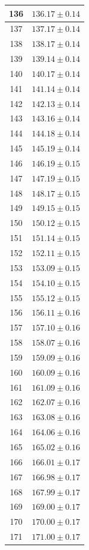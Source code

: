 \documentclass[prb,12pt]{revtex4-2}
\theoremstyle{definition}
\theoremstyle{definition}
\begin{document}
\begin{longtable}{cc}
136 & $136.17\pm 0.14$ \\\midrule
137 & $137.17\pm 0.14$ \\\midrule
138 & $138.17\pm 0.14$ \\\midrule
139 & $139.14\pm 0.14$ \\\midrule
140 & $140.17\pm 0.14$ \\\midrule
141 & $141.14\pm 0.14$ \\\midrule
142 & $142.13\pm 0.14$ \\\midrule
143 & $143.16\pm 0.14$ \\\midrule
144 & $144.18\pm 0.14$ \\\midrule
145 & $145.19\pm 0.14$ \\\midrule
146 & $146.19\pm 0.15$ \\\midrule
147 & $147.19\pm 0.15$ \\\midrule
148 & $148.17\pm 0.15$ \\\midrule
149 & $149.15\pm 0.15$ \\\midrule
150 & $150.12\pm 0.15$ \\\midrule
151 & $151.14\pm 0.15$ \\\midrule
152 & $152.11\pm 0.15$ \\\midrule
153 & $153.09\pm 0.15$ \\\midrule
154 & $154.10\pm 0.15$ \\\midrule
155 & $155.12\pm 0.15$ \\\midrule
156 & $156.11\pm 0.16$ \\\midrule
157 & $157.10\pm 0.16$ \\\midrule
158 & $158.07\pm 0.16$ \\\midrule
159 & $159.09\pm 0.16$ \\\midrule
160 & $160.09\pm 0.16$ \\\midrule
161 & $161.09\pm 0.16$ \\\midrule
162 & $162.07\pm 0.16$ \\\midrule
163 & $163.08\pm 0.16$ \\\midrule
164 & $164.06\pm 0.16$ \\\midrule
165 & $165.02\pm 0.16$ \\\midrule
166 & $166.01\pm 0.17$ \\\midrule
167 & $166.98\pm 0.17$ \\\midrule
168 & $167.99\pm 0.17$ \\\midrule
169 & $169.00\pm 0.17$ \\\midrule
170 & $170.00\pm 0.17$ \\\midrule
171 & $171.00\pm 0.17$ \\\midrule

\end{longtable}
\end{document}
